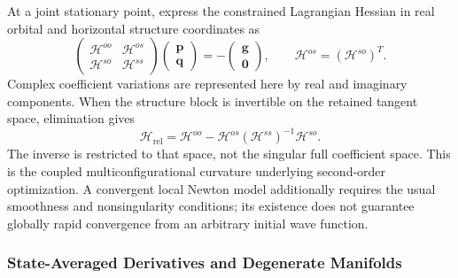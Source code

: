 \documentclass[12pt]{article}
\begin{document}
At a joint stationary point, express the constrained Lagrangian Hessian in real orbital and horizontal structure coordinates as
\begin{equation}
 \begin{pmatrix}
 \mathcal H^{oo}&\mathcal H^{os}\\
 \mathcal H^{so}&\mathcal H^{ss}
 \end{pmatrix}
 \begin{pmatrix}\mathbf p\\\mathbf q\end{pmatrix}
 =-\begin{pmatrix}\mathbf g\\\mathbf 0\end{pmatrix},
 \qquad \mathcal H^{os}=(\mathcal H^{so})^{T}.
 \label{eq:couplednewton}
\end{equation}
Complex coefficient variations are represented here by real and imaginary components. When the structure block is invertible on the retained tangent space, elimination gives
\begin{equation}
 \mathcal H_{\mathrm{rel}}
 =\mathcal H^{oo}
 -\mathcal H^{os}(\mathcal H^{ss})^{-1}\mathcal H^{so}.
 \label{eq:schur}
\end{equation}
The inverse is restricted to that space, not the singular full coefficient space. This is the coupled multiconfigurational curvature underlying second-order optimization.\cite{sun2017} A convergent local Newton model additionally requires the usual smoothness and nonsingularity conditions; its existence does not guarantee globally rapid convergence from an arbitrary initial wave function.

\subsubsection{State-Averaged Derivatives and Degenerate Manifolds}
\end{document}
